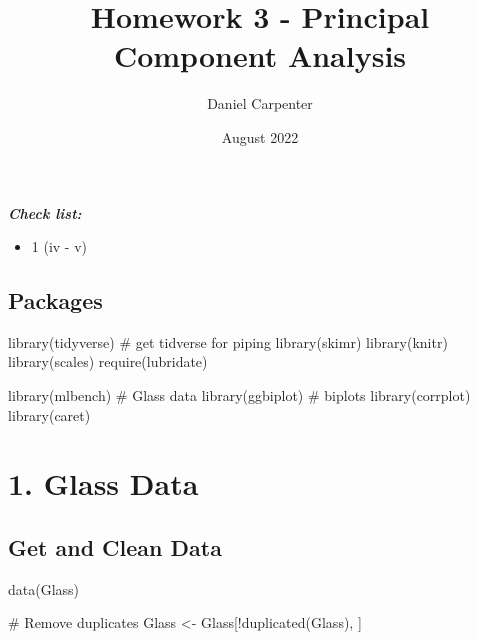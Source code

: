 \documentclass[
  letterpaper,
  DIV=11,
  numbers=noendperiod]{scrartcl}
\title{Homework 3 - Principal Component Analysis}
\author{Daniel Carpenter}
\date{August 2022}
\newenvironment{Shaded}{}{}
\newcommand{\CommentTok}[1]{\textcolor[rgb]{0.42,0.45,0.49}{#1}}
\newcommand{\FunctionTok}[1]{\textcolor[rgb]{0.44,0.26,0.76}{#1}}
\newcommand{\NormalTok}[1]{\textcolor[rgb]{0.14,0.16,0.18}{#1}}
\newcommand{\OtherTok}[1]{\textcolor[rgb]{0.44,0.26,0.76}{#1}}
\newcommand{\SpecialCharTok}[1]{\textcolor[rgb]{0.00,0.36,0.77}{#1}}
\providecommand{\tightlist}{%
  \setlength{\itemsep}{0pt}\setlength{\parskip}{0pt}}\usepackage{longtable,booktabs,array}
\renewcommand*\contentsname{Table of contents}
\newcommand\contentsname{Table of contents}
\begin{document}
\maketitle
\ifdefined\Shaded\renewenvironment{Shaded}{\begin{tcolorbox}[borderline west={3pt}{0pt}{shadecolor}, frame hidden, enhanced, boxrule=0pt, breakable, sharp corners, interior hidden]}{\end{tcolorbox}}\fi

\renewcommand*\contentsname{Table of contents}
{
\hypersetup{linkcolor=}
\setcounter{tocdepth}{2}
\tableofcontents
}
\textbf{\emph{Check list:}}

\begin{itemize}
\tightlist
\item
  1 (iv - v)
\end{itemize}

\newpage

\hypertarget{packages}{%
\subsection{Packages}\label{packages}}

\begin{Shaded}
\begin{Highlighting}[]
\FunctionTok{library}\NormalTok{(tidyverse) }\CommentTok{\# get tidverse for piping}
\FunctionTok{library}\NormalTok{(skimr)}
\FunctionTok{library}\NormalTok{(knitr)}
\FunctionTok{library}\NormalTok{(scales)}
\FunctionTok{require}\NormalTok{(lubridate)}

\FunctionTok{library}\NormalTok{(mlbench)       }\CommentTok{\# Glass data}
\FunctionTok{library}\NormalTok{(ggbiplot)      }\CommentTok{\# biplots}
\FunctionTok{library}\NormalTok{(corrplot)}
\FunctionTok{library}\NormalTok{(caret)}
\end{Highlighting}
\end{Shaded}

\hypertarget{glass-data}{%
\section{1. Glass Data}\label{glass-data}}

\hypertarget{get-and-clean-data}{%
\subsection{Get and Clean Data}\label{get-and-clean-data}}

\begin{Shaded}
\begin{Highlighting}[]
\FunctionTok{data}\NormalTok{(Glass)}

\CommentTok{\# Remove duplicates}
\NormalTok{Glass }\OtherTok{\textless{}{-}}\NormalTok{ Glass[}\SpecialCharTok{!}\FunctionTok{duplicated}\NormalTok{(Glass), ]}
\end{Highlighting}
\end{Shaded}
\end{document}
